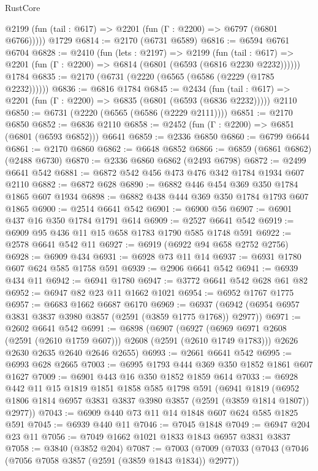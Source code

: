\begin{lexlean}{RustCore}
\begin{coremodule}
      @2199 (fun (tail : @617) => @2201 (fun (Γ : @2200) => @6797 (@6801 @6766)))))
    @1729
@6814 := @2170 (@6731 @6589)
@6816 := @6594 @6761 @6704
@6828 := @2410
    (fun (lets : @2197) =>
    @2199
      (fun (tail : @617) => @2201 (fun (Γ : @2200) => @6814 (@6801 (@6593 (@6816 @2230 @2232))))))
    @1784
@6835 := @2170 (@6731 (@2220 (@6565 (@6586 (@2229 (@1785 @2232))))))
@6836 := @6816 @1784
@6845 := @2434
    (fun (tail : @617) => @2201 (fun (Γ : @2200) => @6835 (@6801 (@6593 (@6836 @2232)))))
    @2110
@6850 := @6731 (@2220 (@6565 (@6586 (@2229 @2111))))
@6851 := @2170 @6850
@6852 := @6836 @2110
@6858 := @2452 (fun (Γ : @2200) => @6851 (@6801 (@6593 @6852))) @6641
@6859 := @2336 @6850
@6860 := @6799 @6644
@6861 := @2170 @6860
@6862 := @6648 @6852
@6866 := @6859 (@6861 @6862) (@2488 @6730)
@6870 := @2336 @6860 @6862 (@2493 @6798)
@6872 := @2499 @6641 @542
@6881 := @6872 @542 @456 @473 @476 @342 @1784 @1934 @607 @2110
@6882 := @6872 @628
@6890 := @6882 @446 @454 @369 @350 @1784 @1865 @607 @1934
@6898 := @6882 @438 @444 @369 @350 @1784 @1793 @607 @1865
@6900 := @2514 @6641 @542
@6901 := @6900 @56
@6907 := @6901 @437 @16 @350 @1784 @1791 @614
@6909 := @2527 @6641 @542
@6919 := @6909 @95 @436 @11 @15 @658 @1783 @1790 @585 @1748 @591
@6922 := @2578 @6641 @542 @11
@6927 := @6919 (@6922 @94 @658 @2752 @2756)
@6928 := @6909 @434
@6931 := @6928 @73 @11 @14
@6937 := @6931 @1780 @607 @624 @585 @1758 @591
@6939 := @2906 @6641 @542
@6941 := @6939 @434 @11
@6942 := @6941 @1780
@6947 := @3772 @6641 @542 @628 @61 @82
@6952 := @6947 @82 @23 @11 @1662 @1021
@6954 := @6952 @1767 @1775
@6957 := @6683 @1662 @6687 @6170
@6969 := @6937 (@6942 (@6954 @6957 @3831 @3837 @3980 @3857 (@2591 (@3859 @1775 @1768)) @2977))
@6971 := @2602 @6641 @542
@6991 := @6898
    (@6907
      (@6927 (@6969 @6971 @2608 (@2591 (@2610 @1759 @607))) @2608 (@2591 (@2610 @1749 @1783)))
      @2626
      @2630
      @2635
      @2640
      @2646
      @2655)
@6993 := @2661 @6641 @542
@6995 := @6993 @628 @2665
@7003 := @6995 @1793 @444 @369 @350 @1852 @1861 @607 @1627
@7009 := @6901 @443 @16 @350 @1852 @1859 @614
@7033 := @6928
    @442
    @11
    @15
    @1819
    @1851
    @1858
    @585
    @1798
    @591
    (@6941
      @1819
      (@6952 @1806 @1814 @6957 @3831 @3837 @3980 @3857 (@2591 (@3859 @1814 @1807)) @2977))
@7043 := @6909 @440 @73 @11 @14 @1848 @607 @624 @585 @1825 @591
@7045 := @6939 @440 @11
@7046 := @7045 @1848
@7049 := @6947 @204 @23 @11
@7056 := @7049 @1662 @1021 @1833 @1843 @6957 @3831 @3837
@7058 := @3840 (@3852 @204)
@7087 := @7003
    (@7009
      (@7033
        (@7043
          (@7046 (@7056 @7058 @3857 (@2591 (@3859 @1843 @1834)) @2977))

\end{coremodule}
\end{lexlean}

